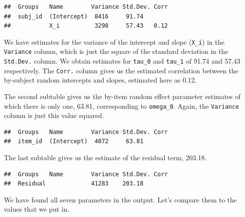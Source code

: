 \documentclass[
  english,
  doc,floatsintext]{apa6}
\begin{document}
\begin{verbatim}
##  Groups   Name        Variance Std.Dev. Corr
##  subj_id  (Intercept)  8416     91.74       
##           X_i          3298     57.43   0.12
\end{verbatim}

\noindent We have estimates for the variance of the intercept and slope (\texttt{X\_i}) in the \texttt{Variance} column, which is just the square of the standard deviation in the \texttt{Std.Dev.} column. We obtain estimates for \texttt{tau\_0} and \texttt{tau\_1} of 91.74 and 57.43 respectively. The \texttt{Corr.} column gives us the estimated correlation between the by-subject random intercepts and slopes, estimated here as 0.12.

The second subtable gives us the by-item random effect parameter estimates of which there is only one, 63.81, corresponding to \texttt{omega\_0}. Again, the \texttt{Variance} column is just this value squared.

\begin{verbatim}
##  Groups   Name        Variance Std.Dev. Corr
##  item_id  (Intercept)  4072     63.81
\end{verbatim}

The last subtable gives us the estimate of the residual term, 203.18.

\begin{verbatim}
##  Groups   Name        Variance Std.Dev. Corr
##  Residual             41283    203.18
\end{verbatim}

We have found all seven parameters in the output. Let's compare them to the values that we put in.
\end{document}
